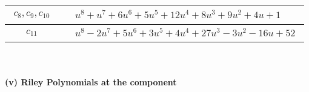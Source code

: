 \documentclass[1p]{elsarticle_modified}
\theoremstyle{definition}
\begin{document}
\begin{tabular}{m{50pt}|m{274pt}}
\hline $$\begin{aligned}c_{8},c_{9},c_{10}\end{aligned}$$&$\begin{aligned}
&u^8+u^7+6 u^6+5 u^5+12 u^4+8 u^3+9 u^2+4 u+1
\end{aligned}$\\
\hline $$\begin{aligned}c_{11}\end{aligned}$$&$\begin{aligned}
&u^8-2 u^7+5 u^6+3 u^5+4 u^4+27 u^3-3 u^2-16 u+52
\end{aligned}$\\
\hline
\end{tabular}\\~\\
\newpage\renewcommand{\arraystretch}{1}
\flushleft \textbf{(v) Riley Polynomials at the component}\newline \\
\end{document}
